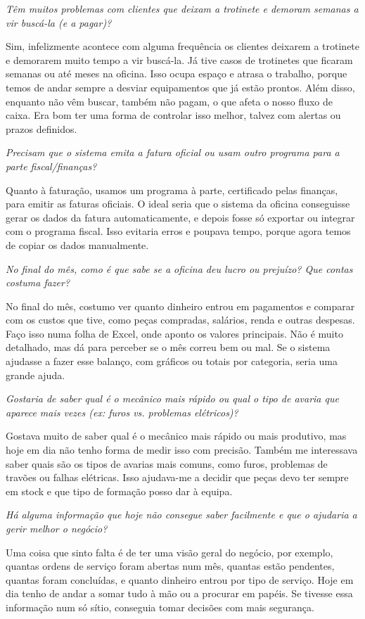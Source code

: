 \documentclass[11pt,a4paper]{article}
\newcommand{\pergunta}[1]{\item[P:] \textit{#1}}
\newcommand{\resposta}[1]{\item[R:] #1}
\begin{document}
\begin{transcription}
		\pergunta{Têm muitos problemas com clientes que deixam a trotinete e demoram semanas a vir buscá-la (e a pagar)?}
		\resposta{Sim, infelizmente acontece com alguma frequência os clientes deixarem a trotinete e demorarem muito tempo a vir buscá-la. Já tive casos de trotinetes que ficaram semanas ou até meses na oficina. Isso ocupa espaço e atrasa o trabalho, porque temos de andar sempre a desviar equipamentos que já estão prontos. Além disso, enquanto não vêm buscar, também não pagam, o que afeta o nosso fluxo de caixa. Era bom ter uma forma de controlar isso melhor, talvez com alertas ou prazos definidos.}
		
		\pergunta{Precisam que o sistema emita a fatura oficial ou usam outro programa para a parte fiscal/finanças?}
		\resposta{Quanto à faturação, usamos um programa à parte, certificado pelas finanças, para emitir as faturas oficiais. O ideal seria que o sistema da oficina conseguisse gerar os dados da fatura automaticamente, e depois fosse só exportar ou integrar com o programa fiscal. Isso evitaria erros e poupava tempo, porque agora temos de copiar os dados manualmente.}
		
		\pergunta{No final do mês, como é que sabe se a oficina deu lucro ou prejuízo? Que contas costuma fazer?}
		\resposta{No final do mês, costumo ver quanto dinheiro entrou em pagamentos e comparar com os custos que tive, como peças compradas, salários, renda e outras despesas. Faço isso numa folha de Excel, onde aponto os valores principais. Não é muito detalhado, mas dá para perceber se o mês correu bem ou mal. Se o sistema ajudasse a fazer esse balanço, com gráficos ou totais por categoria, seria uma grande ajuda.}
		
		\pergunta{Gostaria de saber qual é o mecânico mais rápido ou qual o tipo de avaria que aparece mais vezes (ex: furos vs. problemas elétricos)?}
		\resposta{Gostava muito de saber qual é o mecânico mais rápido ou mais produtivo, mas hoje em dia não tenho forma de medir isso com precisão. Também me interessava saber quais são os tipos de avarias mais comuns, como furos, problemas de travões ou falhas elétricas. Isso ajudava-me a decidir que peças devo ter sempre em stock e que tipo de formação posso dar à equipa.}
		
		\pergunta{Há alguma informação que hoje não consegue saber facilmente e que o ajudaria a gerir melhor o negócio?}
		\resposta{Uma coisa que sinto falta é de ter uma visão geral do negócio, por exemplo, quantas ordens de serviço foram abertas num mês, quantas estão pendentes, quantas foram concluídas, e quanto dinheiro entrou por tipo de serviço. Hoje em dia tenho de andar a somar tudo à mão ou a procurar em papéis. Se tivesse essa informação num só sítio, conseguia tomar decisões com mais segurança.}
		
		
	\end{transcription}
	
\end{document}

